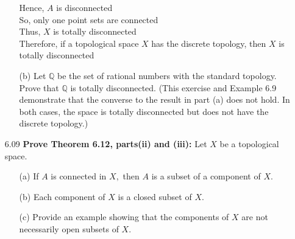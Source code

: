\documentclass[12pt]{article}
\begin{document}
\begin{enumerate}
\begin{enumerate}
			Hence, $ A $ is disconnected\\
			So, only one point sets are connected\\
			Thus, $ X $ is totally disconnected\\
			Therefore, if a topological space $X$ has the discrete topology, then $X$ is totally disconnected
			\item[(b)] Let $\mathbb { Q }$ be the set of rational numbers with the standard topology. Prove	that $\mathbb { Q }$ is totally disconnected. (This exercise and Example 6.9 demonstrate that the converse to the result in part (a) does not hold. In both cases, the space is totally disconnected but does not have the discrete topology.)
		\end{enumerate}
		
		\item[6.09] \textbf{Prove Theorem 6.12, parts(ii) and (iii):} Let $ X $ be a topological space.
		\begin{enumerate}
			\item[(a)]If $A$ is connected in $X ,$ then $A$ is a subset of a component of $X .$
			\item[(b)]Each component of $X$ is a closed subset of $X .$
			\item[(c)] Provide an example showing that the components of $X$ are not necessarily
			open subsets of $X .$
		\end{enumerate}
		

\end{enumerate}
\end{document}
